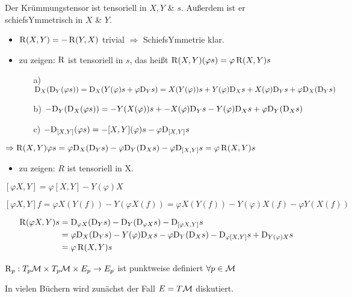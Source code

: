 \begin{satz}
Der Krümmungstensor ist tensoriell in $X, Y$ \& $s$. Außerdem ist er schiefsYmmetrisch in $X$ \& $Y$. 
\begin{bew}
\begin{itemize}
\item $\operatorname{R}(X,Y) = -\operatorname{R}(Y,X)$ trivial $\Rightarrow$ SchiefsYmmetrie klar.
\item zu zeigen: $\operatorname{R}$ ist tensoriell in $s$, das heißt $\operatorname{R}(X,Y)(\varphi s) = \varphi \operatorname{R}(X,Y)s$

	\begin{itemize}
		\item[a)] $\mathrm{D}_X(\mathrm{D}_Y(\varphi s)) = \mathrm{D}_X(Y(\varphi)s + \varphi\mathrm{D}_Ys) = X(Y(\varphi))s + Y(\varphi)\mathrm{D}_Xs + X(\varphi)\mathrm{D}_Ys  + \varphi\mathrm{D}_X(\mathrm{D}_Ys)$
		\item[b)] $-\mathrm{D}_Y(\mathrm{D}_X(\varphi s)) = -Y(X(\varphi))s + -X(\varphi)\mathrm{D}_Ys - Y(\varphi)\mathrm{D}_Xs  + \varphi\mathrm{D}_Y(\mathrm{D}_Xs)$
		\item [c)] $-\mathrm{D}_{[X,Y]}(\varphi s) = -[X,Y](\varphi)s - \varphi\mathrm{D}_{[X,Y]}s$
	\end{itemize}
\end{itemize}
\vspace{.5cm}
$\Rightarrow \operatorname{R}(X,Y) \varphi s = \varphi \mathrm{D}_X(\mathrm{D}_Ys) - \varphi \mathrm{D}_Y(\mathrm{D}_Xs) - \varphi \mathrm{D}_{[X,Y]}s 
= \varphi \operatorname{R}(X,Y)s $
\end{bew}
\begin{itemize}
\item  zu zeigen: $R$ ist tensoriell in X.
\end{itemize}
\begin{hlem}
$[\varphi X,Y] = \varphi[X,Y] - Y(\varphi) X$
\begin{bew}
$[\varphi X,Y]f = \varphi X(Y(f)) - Y(\varphi X(f)) = \varphi X(Y(f)) - Y(\varphi) X(f) - \varphi Y(X(f))$
\end{bew}
\end{hlem}
\begin{bew}
\begin{align*}
\operatorname{R}(\varphi X, Y) s &= \mathrm{D}_{\varphi X} (\mathrm{D}_Ys) - \mathrm{D}_Y(\mathrm{D}_{\varphi X} s) - \mathrm{D}_{[\varphi X,Y]}s \\
&= \varphi \mathrm{D}_X (\mathrm{D}_Ys) - Y(\varphi) \mathrm{D}_Xs - \varphi \mathrm{D}_Y(\mathrm{D}_Xs) - \mathrm{D}_{\varphi [X,Y]}s + \mathrm{D}_{Y(\varphi)X}s \\
&= \varphi \operatorname{R}(X,Y)s
\end{align*}
\end{bew}
\end{satz}
\begin{kor}
$\operatorname{R}_p: T_p\mathcal{M} \times T_p\mathcal{M} \times E_p  \rightarrow E_p$ ist punktweise definiert $\forall p \in \mathcal{M}$
\end{kor}
\begin{bem}
In vielen Büchern wird zunächst der Fall $E= T\mathcal{M}$ diskutiert.
\end{bem}

